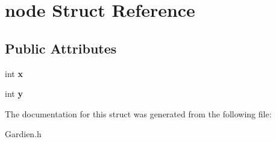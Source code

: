 \hypertarget{structnode}{}\section{node Struct Reference}
\label{structnode}
\subsection*{Public Attributes}
\begin{DoxyCompactItemize}
\item 
\mbox{\label{structnode_a64dd8b65a7d38c632a017d7f36444dbb}} 
int {\bfseries x}
\item 
\mbox{\label{structnode_ae944a3a75efb9856fa5c6f2221e2b49e}} 
int {\bfseries y}
\end{DoxyCompactItemize}


The documentation for this struct was generated from the following file\+:\begin{DoxyCompactItemize}
\item 
Gardien.\+h\end{DoxyCompactItemize}
